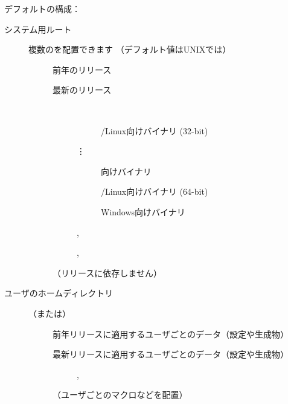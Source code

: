 \documentclass[uplatex,dvipdfmx]{jsarticle}
\begin{document}
\noindent
デフォルトの\TL 構成：
%
\begin{description}
\item[システム用ルート] 複数の\TL を配置できます
  （デフォルト値はUNIXでは）
  \begin{description}
  \item[] 前年のリリース
  \item[] 最新のリリース
    \begin{description}
    \item[] ~
      \begin{description}
      \item[] \GNU/Linux向けバイナリ (32-bit)
      \item[\quad\vdots]
      \item[] \macOS 向けバイナリ
      \item[] \GNU/Linux向けバイナリ (64-bit)
      \item[] Windows向けバイナリ
      \end{description}
    \item[] , 
    \item[] , 
    \item[] 
    \end{description}
  \item[] （リリースに依存しません）
  \end{description}
\item[ユーザのホームディレクトリ] （または）
  \begin{description}
  \item[] 前年リリースに適用するユーザごとのデータ（設定や生成物）
  \item[] 最新リリースに適用するユーザごとのデータ（設定や生成物）
    \begin{description}
    \item[] , 
    \item[] 
    \end{description}
  \item[] （ユーザごとのマクロなどを配置）
  \end{description}
\end{description}
\end{document}

